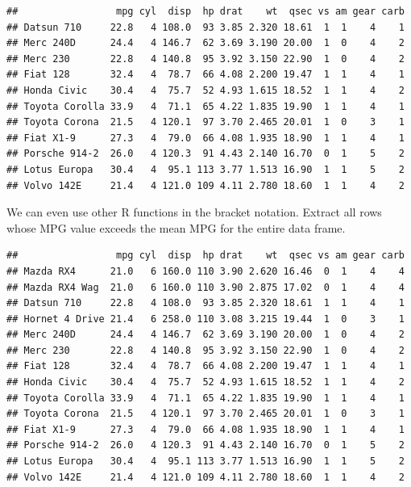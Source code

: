\documentclass[]{book}
\newenvironment{Shaded}{\begin{snugshade}}{\end{snugshade}}
\newcommand{\KeywordTok}[1]{\textcolor[rgb]{0.13,0.29,0.53}{\textbf{#1}}}
\newcommand{\NormalTok}[1]{#1}
\newcommand{\OperatorTok}[1]{\textcolor[rgb]{0.81,0.36,0.00}{\textbf{#1}}}
\newcommand{\StringTok}[1]{\textcolor[rgb]{0.31,0.60,0.02}{#1}}
\begin{document}
\begin{verbatim}
##                 mpg cyl  disp  hp drat    wt  qsec vs am gear carb
## Datsun 710     22.8   4 108.0  93 3.85 2.320 18.61  1  1    4    1
## Merc 240D      24.4   4 146.7  62 3.69 3.190 20.00  1  0    4    2
## Merc 230       22.8   4 140.8  95 3.92 3.150 22.90  1  0    4    2
## Fiat 128       32.4   4  78.7  66 4.08 2.200 19.47  1  1    4    1
## Honda Civic    30.4   4  75.7  52 4.93 1.615 18.52  1  1    4    2
## Toyota Corolla 33.9   4  71.1  65 4.22 1.835 19.90  1  1    4    1
## Toyota Corona  21.5   4 120.1  97 3.70 2.465 20.01  1  0    3    1
## Fiat X1-9      27.3   4  79.0  66 4.08 1.935 18.90  1  1    4    1
## Porsche 914-2  26.0   4 120.3  91 4.43 2.140 16.70  0  1    5    2
## Lotus Europa   30.4   4  95.1 113 3.77 1.513 16.90  1  1    5    2
## Volvo 142E     21.4   4 121.0 109 4.11 2.780 18.60  1  1    4    2
\end{verbatim}

We can even use other R functions in the bracket notation. Extract all rows whose MPG value exceeds the mean MPG for the entire data frame.

\begin{Shaded}
\end{Shaded}

\begin{verbatim}
##                 mpg cyl  disp  hp drat    wt  qsec vs am gear carb
## Mazda RX4      21.0   6 160.0 110 3.90 2.620 16.46  0  1    4    4
## Mazda RX4 Wag  21.0   6 160.0 110 3.90 2.875 17.02  0  1    4    4
## Datsun 710     22.8   4 108.0  93 3.85 2.320 18.61  1  1    4    1
## Hornet 4 Drive 21.4   6 258.0 110 3.08 3.215 19.44  1  0    3    1
## Merc 240D      24.4   4 146.7  62 3.69 3.190 20.00  1  0    4    2
## Merc 230       22.8   4 140.8  95 3.92 3.150 22.90  1  0    4    2
## Fiat 128       32.4   4  78.7  66 4.08 2.200 19.47  1  1    4    1
## Honda Civic    30.4   4  75.7  52 4.93 1.615 18.52  1  1    4    2
## Toyota Corolla 33.9   4  71.1  65 4.22 1.835 19.90  1  1    4    1
## Toyota Corona  21.5   4 120.1  97 3.70 2.465 20.01  1  0    3    1
## Fiat X1-9      27.3   4  79.0  66 4.08 1.935 18.90  1  1    4    1
## Porsche 914-2  26.0   4 120.3  91 4.43 2.140 16.70  0  1    5    2
## Lotus Europa   30.4   4  95.1 113 3.77 1.513 16.90  1  1    5    2
## Volvo 142E     21.4   4 121.0 109 4.11 2.780 18.60  1  1    4    2
\end{verbatim}
\end{document}
